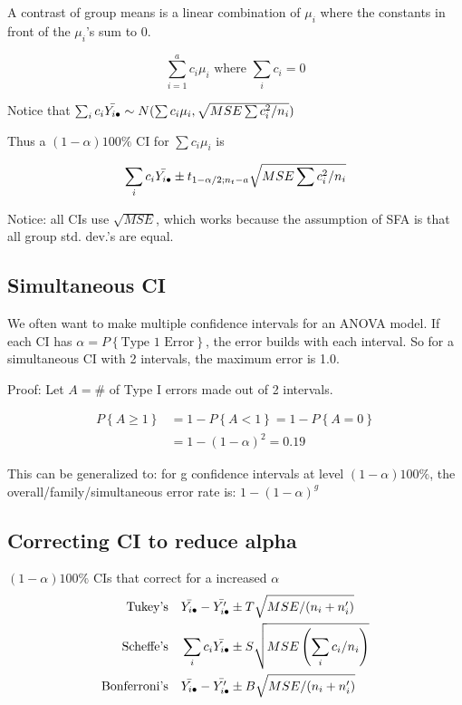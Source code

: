 \documentclass[10pt]{article}
\newcommand{\define}[1]{\colorbox{Thistle2}{#1}}
\newcommand{\mean}[1]{\mu_{#1}}
\newcommand{\prob}[1]{P\left\{#1\right\}}
\begin{document}
\begin{multicols}{3}
    A \define{contrast} of group means is a linear combination of $\mean{i}$ where the constants in front of the $\mean{i}$'s sum to 0.

    \begin{equation}
        \sum^a_{i=1} c_i \mean{i} \text{ where } \sum_i c_i = 0
    \end{equation}

    Notice that $\sum_i c_i \bar{Y_{i\bul}} \sim N(\sum c_i \mean{i}, \sqrt{MSE \sum c_i^2/n_i})$

    Thus a $(1-\alpha)100\%$ CI for $\sum c_i \mean{i}$ is 

    \begin{equation}
        \sum_i c_i \bar{Y_{i\bullet}} \pm t_{1-\alpha/2; n_t - a} \sqrt{MSE \sum c_i^2/n_i}
    \end{equation}

    Notice: all CIs use $\sqrt{MSE}$, which works because the assumption of SFA is that all group std. dev.'s are equal.

    \subsection{Simultaneous CI}

    We often want to make multiple confidence intervals for an ANOVA model. If each CI has $\alpha = \prob{\text{Type 1 Error}}$, the error builds with each interval. So for a simultaneous CI with 2 intervals, the maximum error is 1.0.

    Proof: Let $A = \#$ of Type I errors made out of 2 intervals.

    \begin{align*}
        \prob{A \ge 1} & = 1 - \prob{A < 1} = 1 - \prob{A = 0} \\
                        & = 1 - (1 - \alpha)^2 = 0.19
    \end{align*}

    This can be generalized to: for g confidence intervals at level $(1-\alpha)100\%$, the overall/family/simultaneous error rate is: $1-(1-\alpha)^g$

    \subsection{Correcting CI to reduce alpha}

    $(1-\alpha)100\%$ CIs that correct for a increased $\alpha$
    \begin{align}
        \text{Tukey's} & \quad \bar{Y_{i\bullet}} - \bar{Y_{i\bullet}'} \pm T \sqrt{MSE/(n_i + n_i')} \\
        \text{Scheffe's} & \quad \sum_i c_i \bar{Y_{i\bullet}} \pm S \sqrt{MSE \left(\sum_i c_i/n_i\right)} \\
        \text{Bonferroni's} & \quad \bar{Y_{i\bullet}} - \bar{Y_{i\bullet}'} \pm B \sqrt{MSE/(n_i + n_i')}
    \end{align}


\end{multicols}
\end{document}
